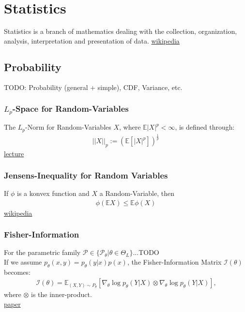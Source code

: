 
\chapter{Statistics}
Statistics is a branch of mathematics dealing with the collection, organization, analysis, interpretation and presentation of data.
\href{https://en.wikipedia.org/wiki/Statistics}{wikipedia}

\section{Probability}
TODO: Probability (general + simple), CDF, Variance, etc.
\subsection{$L_p$-Space for Random-Variables}
The $L_p$-Norm for Random-Variables $X$, where $\mathbb{E}|X|^p < \infty$, is defined through:
\begin{align*}
	||X||_p:=(\mathbb{E}[|X|^p])^{\frac{1}{p}}
\end{align*}
\href{http://www2.stat.duke.edu/courses/Fall18/sta711/lec/wk-05.pdf}{lecture}

\subsection{Jensens-Inequality for Random Variables}
If $\phi$ is a konvex function and $X$ a Random-Variable, then
\begin{align*}
	\phi(\mathbb{E}X) \leq \mathbb{E}\phi(X)
\end{align*}
\href{https://en.wikipedia.org/wiki/Jensen%27s_inequality}{wikipedia}

\subsection{Fisher-Information}
For the parametric family $\mathcal{P} \in \{ \mathcal{P}_\theta | \theta \in \Theta_L\}$...TODO\\
If we assume $p_\theta(x,y)=p_\theta(y|x)p(x)$, the Fisher-Information Matrix $\mathcal{I}(\theta)$ becomes:
\begin{align*}
	\mathcal{I}(\theta) = \mathbb{E}_{(X,Y)\sim {P}_\theta}[\nabla_{\theta}\log p_{\theta}(Y|X)\otimes\nabla_{\theta}\log p_{\theta}(Y|X)]\text{,}
\end{align*}
where $\otimes$ is the inner-product.\\
\href{https://arxiv.org/abs/1711.01530}{paper}

